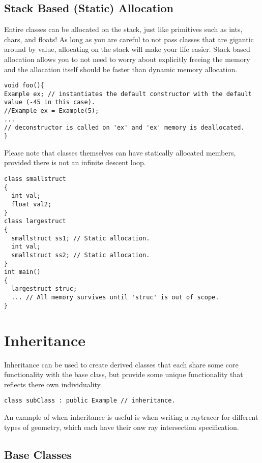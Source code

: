 \documentclass[12pt, letterpaper]{article}
\begin{document}
\subsection{Stack Based (Static) Allocation}

Entire classes can be allocated on the stack, just like primitives such as ints, chars, and floats! As long as you are careful to not pass classes that are gigantic around by value, allocating on the stack will make your life easier. Stack based allocation allows you to not need to worry about explicitly freeing the memory and the allocation itself should be faster than dynamic memory allocation.

\begin{verbatim}
void foo(){
Example ex; // instantiates the default constructor with the default value (-45 in this case).
//Example ex = Example(5);
...
// deconstructor is called on 'ex' and 'ex' memory is deallocated.
}
\end{verbatim}

Please note that classes themselves can have statically allocated members, provided there is not an infinite descent loop.
\begin{verbatim}
class smallstruct
{
  int val;
  float val2;
}
class largestruct
{
  smallstruct ss1; // Static allocation.
  int val;
  smallstruct ss2; // Static allocation.
}
int main()
{
  largestruct struc;
  ... // All memory survives until 'struc' is out of scope.
}
\end{verbatim}

\newpage

\section{Inheritance}

Inheritance can be used to create derived classes that each share some core functionality with the base class, but provide some unique functionality that reflects there own individuality.

\begin{verbatim}
class subClass : public Example // inheritance.
\end{verbatim}

An example of when inheritance is useful is when writing a raytracer for different types of geometry, which each have their onw ray intersection specification.

\subsection{Base Classes}
\end{document}
